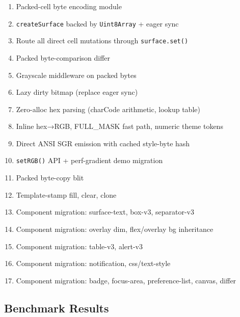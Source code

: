 \begin{enumerate}
\def\labelenumi{\arabic{enumi}.}
\tightlist
\item
  Packed-cell byte encoding module
\item
  \texttt{c\allowbreak{}r\allowbreak{}e\allowbreak{}a\allowbreak{}t\allowbreak{}e\allowbreak{}S\allowbreak{}u\allowbreak{}r\allowbreak{}f\allowbreak{}a\allowbreak{}c\allowbreak{}e} backed by \texttt{U\allowbreak{}i\allowbreak{}n\allowbreak{}t\allowbreak{}8\allowbreak{}A\allowbreak{}r\allowbreak{}r\allowbreak{}a\allowbreak{}y} + eager sync
\item
  Route all direct cell mutations through \texttt{s\allowbreak{}u\allowbreak{}r\allowbreak{}f\allowbreak{}a\allowbreak{}c\allowbreak{}e\allowbreak{}.\allowbreak{}s\allowbreak{}e\allowbreak{}t\allowbreak{}(\allowbreak{})}
\item
  Packed byte-comparison differ
\item
  Grayscale middleware on packed bytes
\item
  Lazy dirty bitmap (replace eager sync)
\item
  Zero-alloc hex parsing (charCode arithmetic, lookup table)
\item
  Inline hex→RGB, FULL\_MASK fast path, numeric theme tokens
\item
  Direct ANSI SGR emission with cached style-byte hash
\item
  \texttt{s\allowbreak{}e\allowbreak{}t\allowbreak{}R\allowbreak{}G\allowbreak{}B\allowbreak{}(\allowbreak{})} API + perf-gradient demo migration
\item
  Packed byte-copy blit
\item
  Template-stamp fill, clear, clone
\item
  Component migration: surface-text, box-v3, separator-v3
\item
  Component migration: overlay dim, flex/overlay bg inheritance
\item
  Component migration: table-v3, alert-v3
\item
  Component migration: notification, css/text-style
\item
  Component migration: badge, focus-area, preference-list, canvas, differ
\end{enumerate}

\subsection{Benchmark Results}\label{record-250-benchmark-results}

